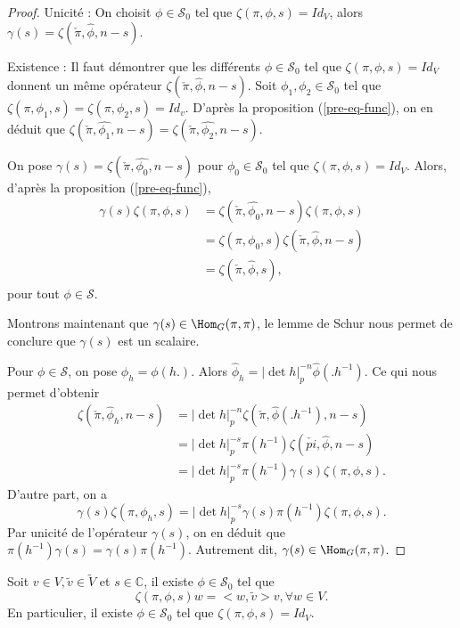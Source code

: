 \begin{proof}
Unicité : On choisit $\phi \in \mathcal{S}_0$ tel que $\zeta(\pi,\phi,s)=Id_V$, alors $\gamma(s)=\zeta(\check{\pi}, \hat{\phi}, n-s)$.

Existence : Il faut démontrer que les différents $\phi \in \mathcal{S}_0$ tel que $\zeta(\pi,\phi,s)=Id_V$ donnent un même opérateur $\zeta(\check{\pi},\hat{\phi}, n-s)$. Soit $\phi_1,\phi_2 \in \mathcal{S}_0$ tel que $\zeta(\pi,\phi_1,s)=\zeta(\pi,\phi_2,s)=Id_v$. D'après la proposition (\ref{pre-eq-func}), on en déduit que $\zeta(\check{\pi},\hat{\phi_1}, n-s)=\zeta(\check{\pi},\hat{\phi_2}, n-s)$.

On pose $\gamma(s)=\zeta(\check{\pi},\hat{\phi_0}, n-s)$ pour $\phi_0 \in \mathcal{S}_0$ tel que $\zeta(\pi,\phi,s)=Id_V$. Alors, d'après la proposition (\ref{pre-eq-func}),
\begin{align}
\gamma(s)\zeta(\pi,\phi,s) &= \zeta(\check{\pi},\hat{\phi_0}, n-s)\zeta(\pi,\phi,s) \\
&= \zeta(\pi,\phi_0,s)\zeta(\check{\pi}, \hat{\phi}, n-s) \\
&= \zeta(\check{\pi}, \hat{\phi},s),
\end{align}
pour tout $\phi \in \mathcal{S}$.

Montrons maintenant que $\gamma(s) \in \Hom_G(\pi,\pi)$, le lemme de Schur nous permet de conclure que $\gamma(s)$ est un scalaire.

Pour $\phi \in \mathcal{S}$, on pose $\phi_h = \phi(h.)$. Alors $\hat{\phi}_h = |\det h|_p^{-n}\hat{\phi}(.h^{-1})$. Ce qui nous permet d'obtenir
\begin{align}
\zeta(\check{\pi}, \hat{\phi}_h, n-s)&=|\det h|_p^{-n}\zeta(\check{\pi}, \hat{\phi}(.h^{-1}),n-s) \\
&= |\det h|_p^{-s}\pi(h^{-1})\zeta(\check{pi}, \hat{\phi}, n-s) \\
&= |\det h|_p^{-s}\pi(h^{-1})\gamma(s)\zeta(\pi,\phi,s).
\end{align}
D'autre part, on a
\begin{equation}
\gamma(s)\zeta(\pi,\phi_h,s)=|\det h|_p^{-s}\gamma(s)\pi(h^{-1})\zeta(\pi,\phi,s).
\end{equation}
Par unicité de l'opérateur $\gamma(s)$, on en déduit que $\pi(h^{-1})\gamma(s)=\gamma(s)\pi(h^{-1})$. Autrement dit, $\gamma(s) \in \Hom_G(\pi,\pi)$.
\end{proof}

\begin{lemme}
Soit $v \in V, \tilde{v} \in \tilde{V}$ et $s \in \mathbb{C}$, il existe $\phi \in \mathcal{S}_0$ tel que
\begin{equation}
\zeta(\pi,\phi,s)w = <w,\tilde{v}>v, \forall w \in V.
\end{equation}
En particulier, il existe $\phi \in \mathcal{S}_0$ tel que $\zeta(\pi, \phi, s) = Id_V.$
\end{lemme}

